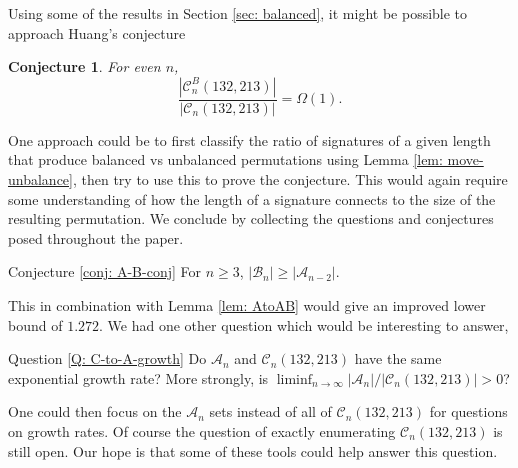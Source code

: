 \documentclass[11pt]{article}
\newcommand\A{\mathcal A}
\newcommand\cB{\mathcal B}
\newcommand\C{\mathcal C}
\newtheorem{conjecture}[theorem]{Conjecture}
\theoremstyle{definition}
\newcommand{\thistheoremname}{}
\newtheorem*{genericthm*}{\thistheoremname}
\newenvironment{namedthm*}[1]
  {\renewcommand{\thistheoremname}{#1}%
   \begin{genericthm*}}
  {\end{genericthm*}}
\begin{document}
Using some of the results in Section \ref{sec: balanced}, it might be possible to approach Huang's conjecture

\begin{conjecture}{\cite[Conjecture 5.1]{H19}}
    For even $n$,
    \[
    \frac{|\C_n^B(132,213)|}{|\C_n(132,213)|} = \Omega(1).
    \]
\end{conjecture}

One approach could be to first classify the ratio of signatures of a given length that produce balanced vs unbalanced permutations using Lemma \ref{lem: move-unbalance}, then try to use this to prove the conjecture. This would again require some understanding of how the length of a signature connects to the size of the resulting permutation. We conclude by collecting the questions and conjectures posed throughout the paper.

\begin{namedthm*}{Conjecture \ref{conj: A-B-conj}}
    For $n \geq 3$, $|\cB_n| \ge |\A_{n-2}|$.
\end{namedthm*}

This in combination with Lemma \ref{lem: AtoAB} would give an improved lower bound of $1.272$. We had one other question which would be interesting to answer,

\begin{namedthm*}{Question \ref{Q: C-to-A-growth}}
    Do $\A_n$ and $\C_n(132,213)$ have the same exponential growth rate? More strongly, is
    $\liminf_{n \to \infty} |\A_n|/|\C_n(132,213)| > 0$?
\end{namedthm*}

One could then focus on the $\A_n$ sets instead of all of $\C_n(132,213)$ for questions on growth rates. Of course the question of exactly enumerating $\C_n(132,213)$ is still open. Our hope is that some of these tools could help answer this question.
\end{document}
